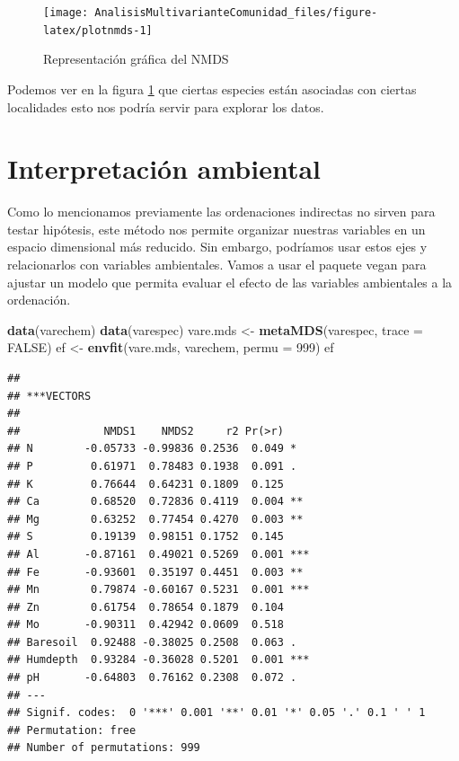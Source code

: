 \documentclass[]{book}
\newenvironment{Shaded}{\begin{snugshade}}{\end{snugshade}}
\newcommand{\KeywordTok}[1]{\textcolor[rgb]{0.13,0.29,0.53}{\textbf{{#1}}}}
\newcommand{\DataTypeTok}[1]{\textcolor[rgb]{0.13,0.29,0.53}{{#1}}}
\newcommand{\DecValTok}[1]{\textcolor[rgb]{0.00,0.00,0.81}{{#1}}}
\newcommand{\StringTok}[1]{\textcolor[rgb]{0.31,0.60,0.02}{{#1}}}
\newcommand{\OtherTok}[1]{\textcolor[rgb]{0.56,0.35,0.01}{{#1}}}
\newcommand{\NormalTok}[1]{{#1}}
\begin{document}
\begin{figure}

{\centering \texttt{[image: AnalisisMultivarianteComunidad\_files/figure-latex/plotnmds-1]} 

}

\caption{Representación gráfica del NMDS}\label{fig:plotnmds}
\end{figure}

Podemos ver en la figura \ref{fig:plotnmds} que ciertas especies están
asociadas con ciertas localidades esto nos podría servir para explorar
los datos.

\chapter{Interpretación ambiental}\label{interpretacion-ambiental}

Como lo mencionamos previamente las ordenaciones indirectas no sirven
para testar hipótesis, este método nos permite organizar nuestras
variables en un espacio dimensional más reducido. Sin embargo, podríamos
usar estos ejes y relacionarlos con variables ambientales. Vamos a usar
el paquete vegan para ajustar un modelo que permita evaluar el efecto de
las variables ambientales a la ordenación.

\begin{Shaded}
\begin{Highlighting}[]
\KeywordTok{data}\NormalTok{(varechem)}
\KeywordTok{data}\NormalTok{(varespec)}
\NormalTok{vare.mds <-}\StringTok{ }\KeywordTok{metaMDS}\NormalTok{(varespec, }\DataTypeTok{trace =} \OtherTok{FALSE}\NormalTok{)}
\NormalTok{ef <-}\StringTok{ }\KeywordTok{envfit}\NormalTok{(vare.mds, varechem, }\DataTypeTok{permu =} \DecValTok{999}\NormalTok{)}
\NormalTok{ef}
\end{Highlighting}
\end{Shaded}

\begin{verbatim}
## 
## ***VECTORS
## 
##             NMDS1    NMDS2     r2 Pr(>r)    
## N        -0.05733 -0.99836 0.2536  0.049 *  
## P         0.61971  0.78483 0.1938  0.091 .  
## K         0.76644  0.64231 0.1809  0.125    
## Ca        0.68520  0.72836 0.4119  0.004 ** 
## Mg        0.63252  0.77454 0.4270  0.003 ** 
## S         0.19139  0.98151 0.1752  0.145    
## Al       -0.87161  0.49021 0.5269  0.001 ***
## Fe       -0.93601  0.35197 0.4451  0.003 ** 
## Mn        0.79874 -0.60167 0.5231  0.001 ***
## Zn        0.61754  0.78654 0.1879  0.104    
## Mo       -0.90311  0.42942 0.0609  0.518    
## Baresoil  0.92488 -0.38025 0.2508  0.063 .  
## Humdepth  0.93284 -0.36028 0.5201  0.001 ***
## pH       -0.64803  0.76162 0.2308  0.072 .  
## ---
## Signif. codes:  0 '***' 0.001 '**' 0.01 '*' 0.05 '.' 0.1 ' ' 1
## Permutation: free
## Number of permutations: 999
\end{verbatim}
\end{document}
